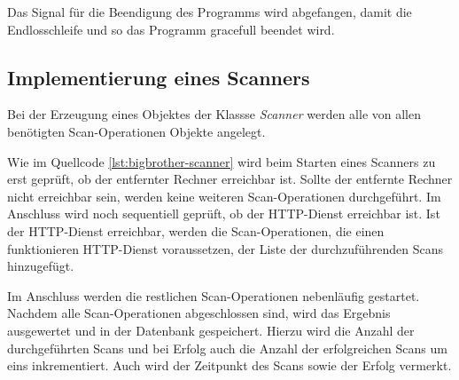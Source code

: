 Das Signal für die Beendigung des Programms wird abgefangen, damit die Endlosschleife und so das Programm gracefull beendet wird.

\subsection{Implementierung eines Scanners}
Bei der Erzeugung eines Objektes der Klassse \textit{Scanner} werden alle von allen benötigten Scan-Operationen Objekte angelegt.

Wie im Quellcode \autoref{lst:bigbrother-scanner} wird beim Starten eines Scanners zu erst geprüft, ob der entfernter Rechner erreichbar ist. Sollte der entfernte Rechner nicht erreichbar sein, werden keine weiteren Scan-Operationen durchgeführt. Im Anschluss wird noch sequentiell geprüft, ob der HTTP-Dienst erreichbar ist. Ist der HTTP-Dienst erreichbar, werden die Scan-Operationen, die einen funktionieren HTTP-Dienst voraussetzen, der Liste der durchzuführenden Scans  hinzugefügt.

Im Anschluss werden die restlichen Scan-Operationen nebenläufig gestartet. Nachdem alle Scan-Operationen abgeschlossen sind, wird das Ergebnis ausgewertet und in der Datenbank gespeichert. Hierzu wird die Anzahl der durchgeführten Scans und bei Erfolg auch die Anzahl der erfolgreichen Scans um eins inkrementiert. Auch wird der Zeitpunkt des Scans sowie der Erfolg vermerkt.

